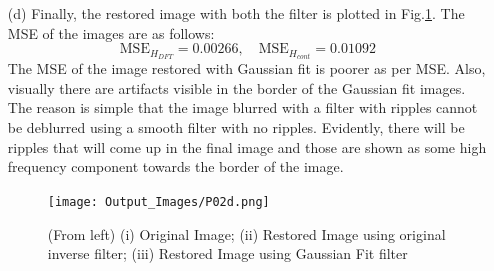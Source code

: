 \documentclass[12pt,a4paper,onecolumn]{exam}
\begin{document}
\begin{solution}
\begin{itemize}
        \item[(d)] Finally, the restored image with both the filter is plotted in Fig.\ref{fig:2d}. The MSE of the images are as follows:
        \[        \text{MSE}_{H_{DFT}} = 0.00266, \quad
        \text{MSE}_{H_{cont}} = 0.01092\]
        The MSE of the image restored with Gaussian fit is poorer as per MSE. Also, visually there are artifacts visible in the border of the Gaussian fit images. The reason is simple that the image blurred with a filter with ripples cannot be deblurred using a smooth filter with no ripples. Evidently, there will be ripples that will come up in the final image and those are shown as some high frequency component towards the border of the image.
        \begin{figure}[H]
        \centering
        \texttt{[image: Output\_Images/P02d.png]}
        \caption{(From left) (i) Original Image; (ii) Restored Image using original inverse filter; (iii) Restored Image using Gaussian Fit filter}
        \label{fig:2d}
        \end{figure}
  \end{itemize}
\end{solution}
\end{document}
